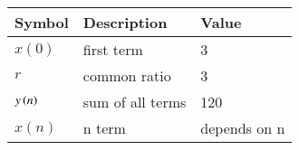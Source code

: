 \begin{tabular}{ | m{1.0cm} | m{3cm} |m{1cm} |} 
  \hline
 Symbol &Description& Value \\ 
 \hline
$x(0)$&first term& 3  \\
\hline
$r$&common ratio & 3  \\
\hline
$y\left(n\right)$& sum of all terms&120 \\
\hline
$x(n)$&n term&  depends on n\\
\hline
\end{tabular}\\
\caption{}
\label{Table:1}